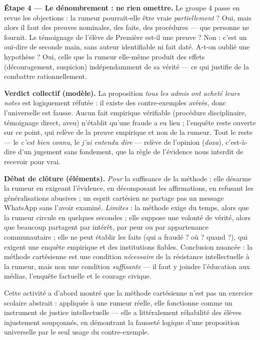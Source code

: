 \documentclass[11pt]{article}
\newcounter{popsec}
\newcounter{popsub}
\newcommand{\courssub}[1]{%
  \stepcounter{popsub}%
  \par\vspace{9pt}\noindent{\popxbold\fontsize{11.5}{13}\selectfont\color{popink}{\color{poporange}\thepopsec.\thepopsub}\hspace{6pt}#1}\par\nopagebreak\vspace{4pt}
}
\begin{document}
\begin{exoresolu}
\textbf{Étape 4 — Le dénombrement : ne rien omettre.} Le groupe 4 passe en revue les objections : la rumeur pourrait-elle être vraie \emph{partiellement} ? Oui, mais alors il faut des preuves nominales, des faits, des procédures — que personne ne fournit. Le témoignage de l'élève de Première est-il une preuve ? Non : c'est un ouï-dire de seconde main, sans auteur identifiable ni fait daté. A-t-on oublié une hypothèse ? Oui, celle que la rumeur elle-même produit des effets (découragement, suspicion) indépendamment de sa vérité — ce qui justifie de la combattre rationnellement.

\textbf{Verdict collectif (modèle).} \guillemotleft La proposition \emph{tous les admis ont acheté leurs notes} est logiquement réfutée : il existe des contre-exemples avérés, donc l'universelle est fausse. Aucun fait empirique vérifiable (procédure disciplinaire, témoignage direct, aveu) n'établit qu'une fraude a eu lieu ; l'enquête reste ouverte sur ce point, qui relève de la preuve empirique et non de la rumeur. Tout le reste — le \emph{c'est bien connu}, le \emph{j'ai entendu dire} — relève de l'opinion (\emph{doxa}), c'est-à-dire d'un jugement sans fondement, que la règle de l'évidence nous interdit de recevoir pour vrai. \guillemotright

\textbf{Débat de clôture (éléments).} \emph{Pour} la suffisance de la méthode : elle désarme la rumeur en exigeant l'évidence, en décomposant les affirmations, en refusant les généralisations abusives ; un esprit cartésien ne partage pas un message WhatsApp sans l'avoir examiné. \emph{Limites} : la méthode exige du temps, alors que la rumeur circule en quelques secondes ; elle suppose une volonté de vérité, alors que beaucoup partagent par intérêt, par peur ou par appartenance communautaire ; elle ne peut établir les faits (qui a fraudé ? où ? quand ?), qui exigent une enquête empirique et des institutions fiables. Conclusion nuancée : la méthode cartésienne est une condition \emph{nécessaire} de la résistance intellectuelle à la rumeur, mais non une condition \emph{suffisante} — il faut y joindre l'éducation aux médias, l'enquête factuelle et le courage civique.
\end{exoresolu}

\courssub{Bilan de l'activité}

Cette activité a d'abord montré que la méthode cartésienne n'est pas un exercice scolaire abstrait : appliquée à une rumeur réelle, elle fonctionne comme un instrument de justice intellectuelle — elle a littéralement réhabilité des élèves injustement soupçonnés, en démontrant la fausseté logique d'une proposition universelle par le seul usage du contre-exemple.
\end{document}
